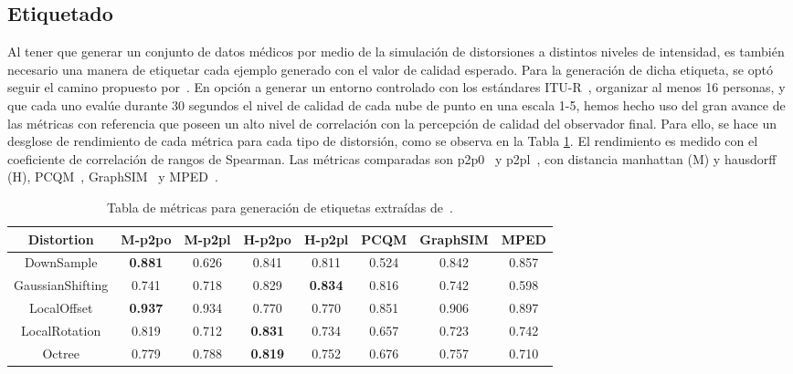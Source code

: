 \subsection{Etiquetado}
Al tener que generar un conjunto de datos médicos por medio de la simulación 
de distorsiones a distintos niveles de intensidad, es también necesario una manera 
de etiquetar cada ejemplo generado con el valor de calidad esperado. 
Para la generación de dicha etiqueta, se optó seguir el camino propuesto por~\cite{ResSCNN}. 
En opción a generar un entorno controlado con los estándares ITU-R~\cite{ITU-R.2012, ITU-R.2021}, 
organizar al menos 16 personas, y que cada uno evalúe durante 30 segundos el nivel 
de calidad de cada nube de punto en una escala 1-5, hemos hecho uso del gran 
avance de las métricas con referencia que poseen un alto nivel de correlación con 
la percepción de calidad del observador final. 
Para ello, se hace un desglose de rendimiento de cada métrica para cada tipo 
de distorsión, como se observa en la Tabla \ref{tab:MetricsPerDistortion}. El 
rendimiento es medido con el coeficiente de correlación de rangos de Spearman.
Las métricas comparadas son p2p0~\cite{PointToPoint} y p2pl~\cite{PointToPlane}, 
con distancia manhattan (M) y hausdorff (H), PCQM~\cite{PCQM}, GraphSIM~\cite{GraphSIM} y 
MPED~\cite{MPED}.

\begin{table}[htp]
    \scriptsize
    \hspace{-.7cm}
    \begin{tabular}{|c|c|c|c|c|c|c|c|}
    \hline
        \rowcolor[HTML]{FFC702} 
        \textbf{Distortion} & \textbf{M-p2po} & \textbf{M-p2pl} & \textbf{H-p2po} & \textbf{H-p2pl} & \textbf{PCQM} & \textbf{GraphSIM} & \textbf{MPED} \\ \hline
        DownSample & \textbf{0.881} & 0.626 & 0.841 & 0.811 & 0.524 & 0.842 & 0.857 \\ \hline
        GaussianShifting & 0.741 & 0.718 & 0.829 & \textbf{0.834} & 0.816 & 0.742 & 0.598 \\ \hline
        LocalOffset & \textbf{0.937} & 0.934 & 0.770 & 0.770 & 0.851 & 0.906 & 0.897 \\ \hline
        LocalRotation & 0.819 & 0.712 & \textbf{0.831} & 0.734 & 0.657 & 0.723 & 0.742 \\ \hline
        Octree & 0.779 & 0.788 & \textbf{0.819} & 0.752 & 0.676 & 0.757 & 0.710 \\ \hline
    \end{tabular}
    \caption[Tabla de métricas para generación de etiquetas.]{
      Tabla de métricas para generación de etiquetas extraídas de~\cite{ResSCNN}.
  }
    \label{tab:MetricsPerDistortion}
\end{table}

